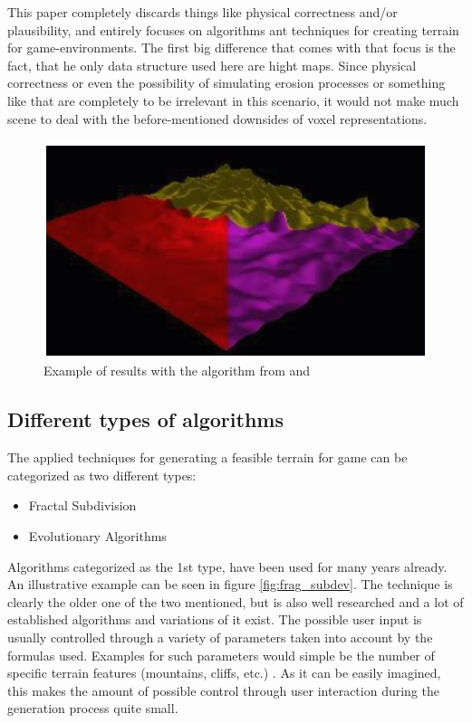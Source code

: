 This paper completely discards things like physical correctness and/or plausibility, and entirely focuses on algorithms ant techniques for creating terrain for game-environments. The first big difference that comes with that focus is the fact, that he only data structure used here are hight maps. Since physical correctness or even the possibility of simulating erosion processes or something like that are completely to be irrelevant in this scenario, it would not make much scene to deal with the before-mentioned downsides of voxel representations.

\begin{figure}[htb]
	\centering
	\includegraphics[width=\linewidth]{RZL12/tz76jt7ut.jpg}
	\caption{Example of results with the algorithm from \cite{ong2005terrain} and \cite{saunders2006realistic}}
	\label{fig:tag15}
\end{figure}

\subsection{Different types of algorithms}
The applied techniques for generating a feasible terrain for game can be categorized as two different types:
\begin{itemize}
	\item Fractal Subdivision 
	\item Evolutionary Algorithms
\end{itemize}

Algorithms categorized as the 1st type, have been used for many years already. An illustrative example can be seen in figure \ref{fig:frag_subdev}. The technique is clearly the older one of the two mentioned, but is also well researched and a lot of established algorithms and variations of it exist. The possible user input is usually controlled through a variety of parameters taken into account by the formulas used. Examples for such parameters would simple be the number of specific terrain features (mountains, cliffs, etc.) \cite{raffe2012survey}. As it can be easily imagined, this makes the amount of possible control through user interaction during the generation process quite small.


